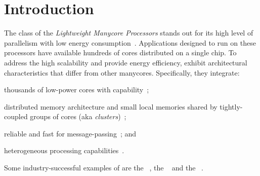 \section{Introduction}
\label{sec:introduction}

	The class of the \textit{Lightweight Manycore Processors} stands out for
	its high level of parallelism with low energy
	consumption~\cite{francesquini2015}. Applications designed to run on these
	processors have available hundreds of cores distributed on a single chip.
	To address the high scalability and provide energy efficiency, \lws exhibit
	architectural characteristics that differ from other manycores.
	Specifically, they integrate:
	\begin{enumerate*}[label=(\roman*)]
		\item thousands of low-power cores with \mimd capability~\cite{Rossi2017};
		\item distributed memory architecture and small local memories shared by
			tightly-coupled groups of cores (aka \textit{clusters})~\cite{Bohnenstiehl2017};
		\item reliable and fast \nocs for message-passing~\cite{Bohnenstiehl2017}; and
		\item heterogeneous processing capabilities~\cite{Davidson2018}.
	\end{enumerate*}
	Some industry-successful examples of \lws are the
	\mppa~\cite{DeDinechin2013-2}, the \epiphany~\cite{Olofsson2016} and the
	\taihulight~\cite{Fu2016}.

\iffalse
	Esses processadores introduziram junto de suas vantagens, um conjunto de
	desafios no projeto e desenvolvimento de aplicações de baíxo e alto nível
	inserido pelas suas características arquiteturais. Algumas desses desafios
	são:
	\begin{itemize}
		\item Modelo de Programação Híbrida: uso do modelo de memória
			compartilhada para explorar o paralelismo dentro dos clusters e
			aplicação do modelo de troca de mensagens para lidar com
			comunicação entre clusters através da NoC~\cite{kelly2013};

		\item Falta de suporte em hardware para coerência de cache: para
			reduzir o consumo de energia requirindo o controle explícito da
			memória~\cite{francesquini2015};.

		\item Sistem de memória restritivo: a presença de múltiplos espaços de
			endereçamento e pequenas memórias locais requer o Data Tiling
			e Prefetching seja manipulado em software~\cite{Castro2016};

		\item Configurações heterogeneas: requer a programação de componentes
			distintos, dificultando o deploy de aplicações no
			\lws~\cite{Barbalace2015}.
	\end{itemize}
\fi

